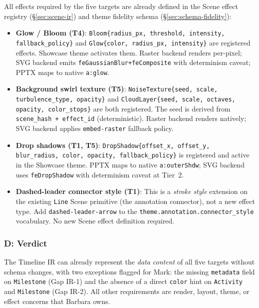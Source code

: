 All effects required by the five targets are already defined in the Scene effect registry
(\S\ref{sec:scene-ir}) and theme fidelity schema (\S\ref{sec:schema-fidelity}):

\begin{itemize}
  \item \textbf{Glow / Bloom (T4)}: \texttt{Bloom\{radius\_px, threshold, intensity,
        fallback\_policy\}} and \texttt{Glow\{color, radius\_px, intensity\}} are
        registered effects. Showcase theme activates them. Raster backend renders
        per-pixel; SVG backend emits \texttt{feGaussianBlur+feComposite} with
        determinism caveat; PPTX maps to native \texttt{a:glow}.

  \item \textbf{Background swirl texture (T5)}: \texttt{NoiseTexture\{seed, scale,
        turbulence\_type, opacity\}} and \texttt{CloudLayer\{seed, scale, octaves,
        opacity, color\_stops\}} are both registered. The seed is derived from
        \texttt{scene\_hash + effect\_id} (deterministic). Raster backend renders
        natively; SVG backend applies \texttt{embed-raster} fallback policy.

  \item \textbf{Drop shadows (T1, T5)}: \texttt{DropShadow\{offset\_x, offset\_y,
        blur\_radius, color, opacity, fallback\_policy\}} is registered and active in
        the Showcase theme. PPTX maps to native \texttt{a:outerShdw}; SVG backend uses
        \texttt{feDropShadow} with determinism caveat at Tier~2.

  \item \textbf{Dashed-leader connector style (T1)}: This is a \emph{stroke style}
        extension on the existing \texttt{Line} Scene primitive (the annotation
        connector), not a new effect type. Add \texttt{dashed-leader-arrow} to the
        \texttt{theme.annotation.connector\_style} vocabulary. No new Scene effect
        definition required.
\end{itemize}

\subsubsection{D: Verdict}
\label{sec:target-verdict}

The Timeline IR can already represent the \emph{data content} of all five targets
without schema changes, with two exceptions flagged for Mark: the missing
\texttt{metadata} field on \texttt{Milestone} (Gap IR-1) and the absence of a direct
\texttt{color} hint on \texttt{Activity} and \texttt{Milestone} (Gap IR-2).
All other requirements are render, layout, theme, or effect concerns that Barbara owns.


